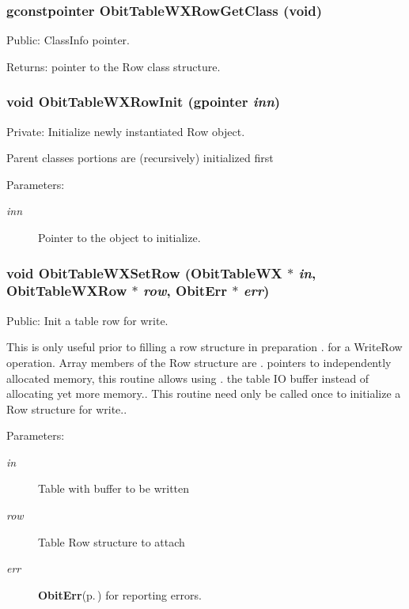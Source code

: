 \subsubsection{\setlength{\rightskip}{0pt plus 5cm}gconstpointer Obit\-Table\-WXRow\-Get\-Class (void)}\label{ObitTableWX_8c_a15}


Public: Class\-Info pointer. 

\begin{Desc}
\item[Returns:]pointer to the Row class structure. \end{Desc}
\subsubsection{\setlength{\rightskip}{0pt plus 5cm}void Obit\-Table\-WXRow\-Init (gpointer {\em inn})}\label{ObitTableWX_8c_a6}


Private: Initialize newly instantiated Row object. 

Parent classes portions are (recursively) initialized first \begin{Desc}
\item[Parameters:]
\begin{description}
\item[{\em inn}]Pointer to the object to initialize. \end{description}
\end{Desc}
\subsubsection{\setlength{\rightskip}{0pt plus 5cm}void Obit\-Table\-WXSet\-Row ({\bf Obit\-Table\-WX} $\ast$ {\em in}, {\bf Obit\-Table\-WXRow} $\ast$ {\em row}, {\bf Obit\-Err} $\ast$ {\em err})}\label{ObitTableWX_8c_a23}


Public: Init a table row for write. 

This is only useful prior to filling a row structure in preparation . for a Write\-Row operation. Array members of the Row structure are . pointers to independently allocated memory, this routine allows using . the table IO buffer instead of allocating yet more memory.. This routine need only be called once to initialize a Row structure for write.. \begin{Desc}
\item[Parameters:]
\begin{description}
\item[{\em in}]Table with buffer to be written \item[{\em row}]Table Row structure to attach \item[{\em err}]{\bf Obit\-Err}{\rm (p.\,\pageref{structObitErr})} for reporting errors. \end{description}
\end{Desc}
